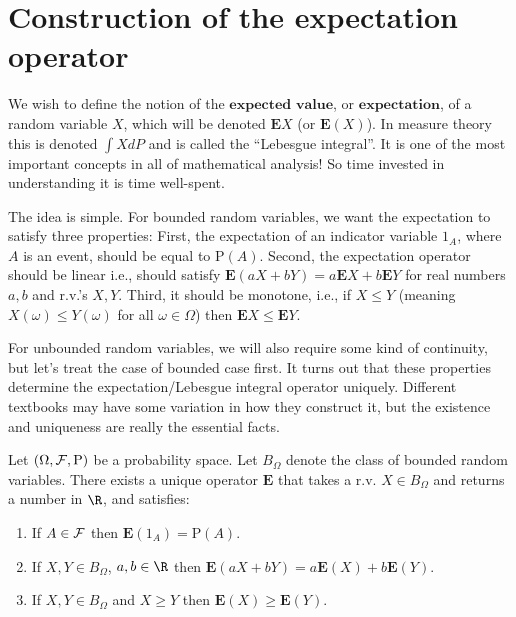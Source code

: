 \section{Construction of the expectation operator}

We wish to define the notion of the
$\textbf{expected value}$, or $\textbf{expectation}$,
of a random variable $X$, which will be denoted
$\mathbf{E} X$ (or $\mathbf{E}(X)$). In measure
theory this is denoted $\int X dP$ and is called the
``Lebesgue integral''. It is one of the most important
concepts in all of mathematical analysis! So time
invested in understanding it is time well-spent.

The idea is simple. For bounded random variables, we
want the expectation to satisfy three properties:
First, the expectation of an indicator variable $1_A$,
where $A$ is an event, should be equal to
$\mathrm{P}(A)$. Second, the expectation operator
should be linear i.e., should satisfy
$\mathbf{E}(aX+bY)=a\mathbf{E} X+b\mathbf{E} Y$ for
real numbers $a,b$ and r.v.'s $X,Y$. Third, it should
be monotone, i.e., if $X\le Y$ (meaning
$X(\omega)\le Y(\omega)$ for all $\omega\in \Omega$)
then $\mathbf{E} X\le \mathbf{E} Y$.

For unbounded random variables, we will also require
some kind of continuity, but let's treat the case of
bounded case first. It turns out that these properties
determine the expectation/Lebesgue integral operator
uniquely. Different textbooks may have some variation
in how they construct it, but the existence and
uniqueness are really the essential facts.

\begin{thm}
\label{thm-expecproperties}
Let $(\Omega, {\cal F}, \mathrm{P})$ be a probability
space. Let $B_\Omega$ denote the class of bounded
random variables. There exists a unique operator
$\mathbf{E}$ that takes a r.v. $X\in B_\Omega$ and
returns a number in $\R$, and satisfies:

\begin{enumerate}[label=\arabic*.]
\item If $A\in {\cal F}$ then
$\mathbf{E}(1_A) = \mathrm{P}(A)$.

\item If $X,Y\in B_\Omega$, $a,b\in\R$ then
$\mathbf{E}(aX+bY) = a\mathbf{E}(X)+b\mathbf{E}(Y)$.

\item If $X,Y\in B_\Omega$ and $X\ge Y$ then
$\mathbf{E}(X)\ge \mathbf{E}(Y)$.
\end{enumerate}

\end{thm}

